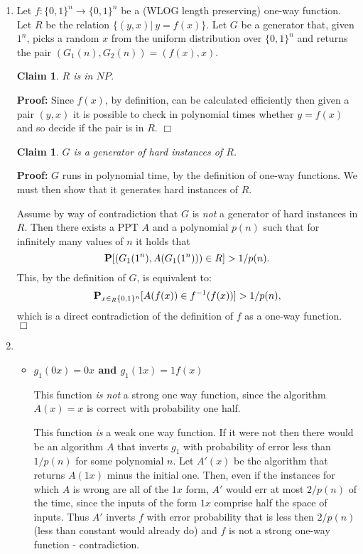 \documentclass[11pt]{article} \usepackage{amssymb}
\newtheorem{claim}[theorem]{Claim}
\newenvironment{proof}{\noindent \textbf{Proof:}}{$\Box$}
\begin{document}
\begin{enumerate}
\item Let $f:\{0,1\}^n\to\{0,1\}^n$ be a (WLOG length preserving) 
  one-way function. Let $R$ be the relation
  $\{(y,x)|\:y=f(x)\}$. Let $G$ be a generator that, given $1^n$, picks a random
  $x$ from the uniform distribution over $\{0,1\}^n$ and returns the pair
  $(G_1(n),G_2(n))=(f(x),x)$.
  
  \begin{claim}
    $R$ is in $NP$.
  \end{claim}
  \begin{proof}
    Since $f(x)$, by definition, can be calculated efficiently then given a pair
    $(y,x)$ it is possible to check in polynomial times whether $y=f(x)$ and so 
    decide if the pair is in $R$.
  \end{proof}
  \begin{claim}
    $G$ is a generator of hard instances of $R$.
  \end{claim}
  \begin{proof}
    $G$ runs in polynomial time, by the definition of one-way functions. We 
    must then show that it generates hard instances of $R$.
    
    Assume by way of contradiction that $G$ is {\em not} a generator of hard
    instances in $R$. Then there exists a PPT $A$ and a polynomial $p(n)$ such
    that for infinitely many values of $n$ it holds that
    $$\P[(G_1(1^n), A(G_1(1^n)))\in R]>1/p(n).$$
    This, by the definition of $G$, is equivalent to:
    $$\P_{x\in_R\{0,1\}^n}[A(f(x))\in f^{-1}(f(x))]>1/p(n),$$
    which is a direct contradiction of the definition of $f$ as a one-way 
    function.
  \end{proof}
  
\item
  \begin{itemize}
    I assume here that the OWF's are length preserving.
  \item {\bf $g_1(0x) = 0x$ and $g_1(1x) = 1f(x)$}

    This function {\em is not} a strong one way function, since the algorithm
    $A(x)=x$ is correct with probability one half. 

    This function {\em is } a weak one way function. If it were not then there
    would be an algorithm $A$ that inverts $g_1$ with probability of error 
    less than $1/p(n)$ for some polynomial $n$. Let $A'(x)$ be the algorithm
    that returns $A(1x)$ minus the initial one. Then, even if the instances for
    which $A$ is wrong are all of the $1x$ form, $A'$ would err at most 
    $2/p(n)$ of the time, since the inputs of the form $1x$ comprise half the 
    space of inputs. Thus $A'$ inverts $f$ with
    error probability that is less then $2/p(n)$ (less than constant would 
    already do) and $f$ is not a strong one-way function - contradiction.


\end{itemize}
\end{enumerate}
\end{document}
